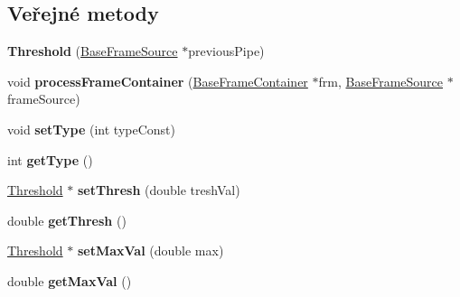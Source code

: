 \subsection*{Veřejné metody}
\begin{DoxyCompactItemize}
\item 
\hypertarget{class_ar_pipe_1_1_threshold_ae714b2f34950e11dbd5ce399bf7da5fc}{{\bfseries Threshold} (\hyperlink{class_ar_pipe_1_1_base_frame_source}{Base\-Frame\-Source} $\ast$previous\-Pipe)}\label{d8/df3/class_ar_pipe_1_1_threshold_ae714b2f34950e11dbd5ce399bf7da5fc}

\item 
\hypertarget{class_ar_pipe_1_1_threshold_a6cff62cb7bce78cf9d741c286b6dbb9e}{void {\bfseries process\-Frame\-Container} (\hyperlink{class_ar_pipe_1_1_base_frame_container}{Base\-Frame\-Container} $\ast$frm, \hyperlink{class_ar_pipe_1_1_base_frame_source}{Base\-Frame\-Source} $\ast$frame\-Source)}\label{d8/df3/class_ar_pipe_1_1_threshold_a6cff62cb7bce78cf9d741c286b6dbb9e}

\item 
\hypertarget{class_ar_pipe_1_1_threshold_aec36111ebf06dec612aeec433483db60}{void {\bfseries set\-Type} (int type\-Const)}\label{d8/df3/class_ar_pipe_1_1_threshold_aec36111ebf06dec612aeec433483db60}

\item 
\hypertarget{class_ar_pipe_1_1_threshold_af1ba0f9421d1dfd91392461d55ddc6d6}{int {\bfseries get\-Type} ()}\label{d8/df3/class_ar_pipe_1_1_threshold_af1ba0f9421d1dfd91392461d55ddc6d6}

\item 
\hypertarget{class_ar_pipe_1_1_threshold_a3cc5112ebe234f173d838241f5d34642}{\hyperlink{class_ar_pipe_1_1_threshold}{Threshold} $\ast$ {\bfseries set\-Thresh} (double tresh\-Val)}\label{d8/df3/class_ar_pipe_1_1_threshold_a3cc5112ebe234f173d838241f5d34642}

\item 
\hypertarget{class_ar_pipe_1_1_threshold_abbdd0700d58ecf1a0523b07924979441}{double {\bfseries get\-Thresh} ()}\label{d8/df3/class_ar_pipe_1_1_threshold_abbdd0700d58ecf1a0523b07924979441}

\item 
\hypertarget{class_ar_pipe_1_1_threshold_a406a70d7ba3e40ce169798ecb83f2a09}{\hyperlink{class_ar_pipe_1_1_threshold}{Threshold} $\ast$ {\bfseries set\-Max\-Val} (double max)}\label{d8/df3/class_ar_pipe_1_1_threshold_a406a70d7ba3e40ce169798ecb83f2a09}

\item 
\hypertarget{class_ar_pipe_1_1_threshold_a889342cf5ddba9fa2a5b778b3a609786}{double {\bfseries get\-Max\-Val} ()}\label{d8/df3/class_ar_pipe_1_1_threshold_a889342cf5ddba9fa2a5b778b3a609786}


\end{DoxyCompactItemize}
